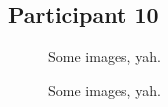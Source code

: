 \lipsum[1]


\clearpage

\subsection{Participant 10}

\begin{figure}[h]
	\caption{Some images, yah.}
\end{figure}

\lipsum[1]

\clearpage

\begin{figure}[h]
	\caption{Some images, yah.}
\end{figure}

